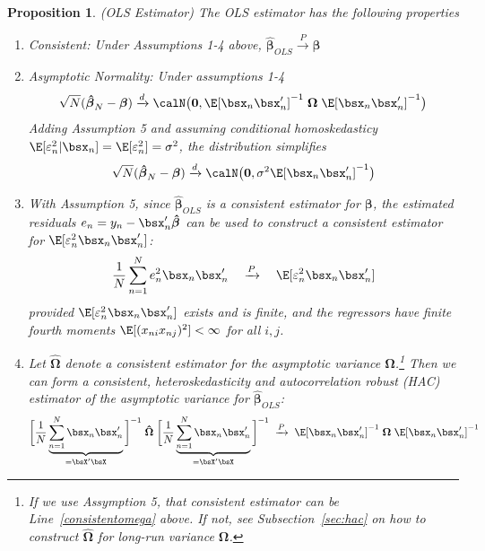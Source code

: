 \documentclass[12pt]{article}
\theoremstyle{plain}
\newtheorem{prop}[thm]{Proposition}
\theoremstyle{definition}
\theoremstyle{remark}
\newcommand{\bsbeta}{\boldsymbol{\beta}}
\newcommand{\bsOmega}{\boldsymbol{\Omega}}
\newcommand{\bshatbeta}{\boldsymbol{\hat{\beta}}}
\newcommand{\bshatOmega}{\boldsymbol{\hat{\Omega}}}
\renewcommand{\bso}{\boldsymbol{0}}
\newcommand{\pto}{\xrightarrow{P}}
\newcommand{\dto}{\xrightarrow{d}}
\newcommand{\sumnN}{\sum^N_{n=1}}
\begin{document}
\begin{prop}\emph{(OLS Estimator)}
The OLS estimator has the following properties
\begin{enumerate}
  \item \emph{Consistent}: Under Assumptions 1-4 above,
    $\bshatbeta_{OLS}\pto \bsbeta$
  \item \emph{Asymptotic Normality}: Under assumptions 1-4
    \begin{align*}
      \sqrt{N}(\bshatbeta_N- \bsbeta) \dto
      \calN\big(
        \bso,\E[\bsx_n\bsx_n']^{-1}\;\bsOmega\;\E[\bsx_n\bsx_n']^{-1}
      \big)
    \end{align*}
    Adding Assumption 5 and assuming conditional homoskedasticy
    $\E[\varepsilon_n^2|\bsx_n]=\E[\varepsilon_n^2]=\sigma^2$, the
    distribution simplifies
    \begin{align*}
      \sqrt{N}(\bshatbeta_N- \bsbeta) \dto
      \calN\big(\bso,\sigma^2\E[\bsx_n\bsx_n']^{-1}\big)
    \end{align*}

  \item With Assumption 5, since $\bshatbeta_{OLS}$ is a consistent
    estimator for $\bsbeta$, the estimated residuals
    $e_n = y_n - \bsx_n' \bshatbeta$ can be used to construct a
    consistent estimator for $\E[\varepsilon_n^2\bsx_n\bsx_n']$:
    \begin{align}
      \frac{1}{N} \sumnN e^2_n \bsx_n \bsx_n'
      \quad\pto\quad
      \E[\varepsilon_n^2\bsx_n\bsx_n']
      \label{consistentomega}
    \end{align}
    provided $\E[\varepsilon_n^2\bsx_n\bsx_n']$ exists and is finite,
    and the regressors have finite fourth moments
    $\E[(x_{ni}x_{nj})^2]<\infty$ for all $i,j$.

  \item
    Let $\bshatOmega$ denote a consistent estimator for the asymptotic
    variance $\bsOmega$.\footnote{%
      If we use Assymption 5, that consistent estimator can be
      Line~\ref{consistentomega} above. If not, see
      Subsection~\ref{sec:hac} on how to construct $\bshatOmega$ for
      long-run variance $\bsOmega$.
    }
    Then we can form a consistent, heteroskedasticity and
    autocorrelation robust (HAC) estimator of the asymptotic variance
    for $\bshatbeta_{OLS}$:
    \begin{align*}
      \bigg[
        \frac{1}{N} \underbrace{\sumnN \bsx_n\bsx_n'}_{=\bsX'\bsX}
      \bigg]^{-1}
      \;
      \bshatOmega\;
      \bigg[
        \frac{1}{N} \underbrace{\sumnN \bsx_n\bsx_n'}_{=\bsX'\bsX}
      \bigg]^{-1}
      \;\pto\;
      \E[\bsx_n\bsx_n']^{-1}\;\bsOmega\;\E[\bsx_n\bsx_n']^{-1}
    \end{align*}


\end{enumerate}
\end{prop}
\end{document}
